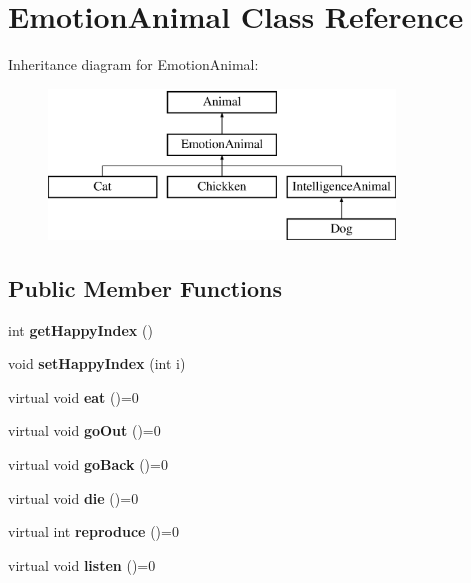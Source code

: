 \hypertarget{class_emotion_animal}{}\section{Emotion\+Animal Class Reference}
\label{class_emotion_animal}
Inheritance diagram for Emotion\+Animal\+:\begin{figure}[H]
\begin{center}
\leavevmode
\includegraphics[height=4.000000cm]{class_emotion_animal}
\end{center}
\end{figure}
\subsection*{Public Member Functions}
\begin{DoxyCompactItemize}
\item 
\mbox{\label{class_emotion_animal_ae075ddea4c14459fc47dd8fb6b986676}} 
int {\bfseries get\+Happy\+Index} ()
\item 
\mbox{\label{class_emotion_animal_af269fd4dc612625c77ce55667502a092}} 
void {\bfseries set\+Happy\+Index} (int i)
\item 
\mbox{\label{class_emotion_animal_ad112df6f803ac02b701558c4765c8dc9}} 
virtual void {\bfseries eat} ()=0
\item 
\mbox{\label{class_emotion_animal_a4961194875c3c286808f2aa2a23eec3d}} 
virtual void {\bfseries go\+Out} ()=0
\item 
\mbox{\label{class_emotion_animal_aee6f0e1c1bf618172d59a79fe1630190}} 
virtual void {\bfseries go\+Back} ()=0
\item 
\mbox{\label{class_emotion_animal_ad89a20ca48b79c9fc5681d6b5a811330}} 
virtual void {\bfseries die} ()=0
\item 
\mbox{\label{class_emotion_animal_a499ff4778d256bac4cc3604ff764e371}} 
virtual int {\bfseries reproduce} ()=0
\item 
\mbox{\label{class_emotion_animal_a9740606110f30a35c2a64fda0200ea6f}} 
virtual void {\bfseries listen} ()=0
\end{DoxyCompactItemize}

